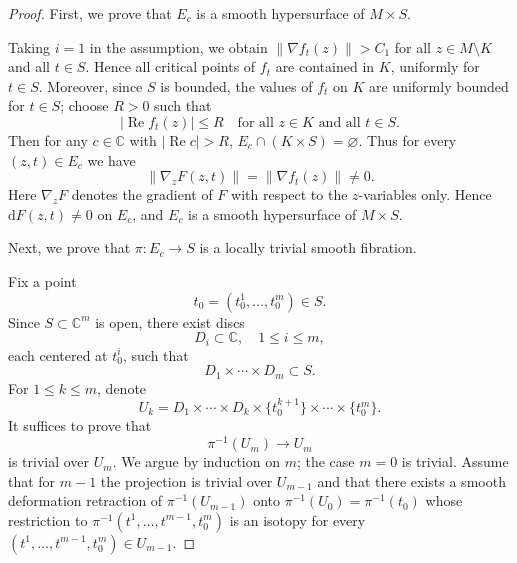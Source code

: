 \documentclass[11pt]{amsart}
\theoremstyle{plain}
\theoremstyle{definition}
\theoremstyle{remark}
\numberwithin{equation}{section}
\begin{document}
\begin{proof}
    First, we prove that $E_c$ is a smooth hypersurface of $M \times S$.

    Taking $i = 1$ in the assumption, we obtain $\|\nabla f_t(z)\| > C_1$ for all $z \in M \setminus K$ and all $t \in S$.
    Hence all critical points of $f_t$ are contained in $K$, uniformly for $t \in S$.
    Moreover, since $S$ is bounded, the values of $f_t$ on $K$ are uniformly bounded for $t \in S$; choose $R > 0$ such that
    \begin{equation}
        |\operatorname{Re} f_t(z)| \le R \quad \text{for all } z \in K \text{ and all } t \in S.
    \end{equation}
    Then for any $c \in \mathbb{C}$ with $|\operatorname{Re} c| > R$, $E_c\cap(K\times S)=\varnothing$.
    Thus for every $(z,t) \in E_c$ we have
    \begin{equation}
        \|\nabla_z F(z,t)\| = \|\nabla f_t(z)\| \neq 0.
    \end{equation}
    Here $\nabla_z F$ denotes the gradient of $F$ with respect to the $z$-variables only.
    Hence $\mathrm{d}F(z,t) \neq 0$ on $E_c$, and $E_c$ is a smooth hypersurface of $M \times S$.

    Next, we prove that $\pi : E_c \to S$ is a locally trivial smooth fibration.

    Fix a point
    \begin{equation}
        t_0 = (t_0^1, \ldots, t_0^m) \in S.
    \end{equation}
    Since $S \subset \mathbb{C}^m$ is open, there exist discs
    \begin{equation}
        D_i \subset \mathbb{C}, \quad 1 \le i \le m,
    \end{equation}
    each centered at $t_0^i$, such that
    \begin{equation}
        D_1 \times \cdots \times D_m \subset S.
    \end{equation}
    For $1 \le k \le m$, denote
    \begin{equation}
        U_k = D_1 \times \cdots \times D_k \times \{t_0^{k+1}\} \times \cdots \times \{t_0^m\}.
    \end{equation}
    It suffices to prove that
    \begin{equation}
        \pi^{-1}(U_m) \to U_m
    \end{equation}
    is trivial over $U_m$.
    We argue by induction on $m$; the case $m = 0$ is trivial.
    Assume that for $m - 1$ the projection is trivial over $U_{m-1}$ and that there exists a smooth deformation retraction of $\pi^{-1}(U_{m-1})$ onto $\pi^{-1}(U_0) = \pi^{-1}(t_0)$ whose restriction to $\pi^{-1}(t^1, \ldots, t^{m-1}, t_0^m)$ is an isotopy for every $(t^1, \ldots, t^{m-1}, t_0^m) \in U_{m-1}$.


\end{proof}
\end{document}
